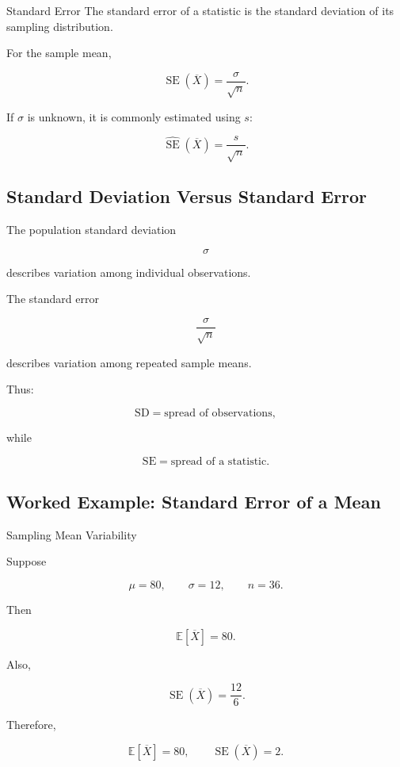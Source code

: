 \begin{definitionbox}{Standard Error}
The standard error of a statistic is the standard deviation of its
sampling distribution.
\end{definitionbox}

For the sample mean,

\[
\boxed{
\operatorname{SE}(\overline{X})
=
\frac{\sigma}{\sqrt{n}}.
}
\]

If \(\sigma\) is unknown, it is commonly estimated using \(s\):

\[
\boxed{
\widehat{\operatorname{SE}}(\overline{X})
=
\frac{s}{\sqrt{n}}.
}
\]

\subsection{Standard Deviation Versus Standard Error}
\label{subsec:sd-versus-se}

The population standard deviation

\[
\sigma
\]

describes variation among individual observations.

The standard error

\[
\frac{\sigma}{\sqrt{n}}
\]

describes variation among repeated sample means.

Thus:

\[
\boxed{
\text{SD}
=
\text{spread of observations},
}
\]

while

\[
\boxed{
\text{SE}
=
\text{spread of a statistic}.
}
\]

\subsection{Worked Example: Standard Error of a Mean}
\label{subsec:worked-se-mean}

\begin{workedexamplebox}{Sampling Mean Variability}

Suppose

\[
\mu=80,
\qquad
\sigma=12,
\qquad
n=36.
\]

Then

\[
\mathbb{E}[\overline{X}]
=
80.
\]

Also,

\[
\operatorname{SE}(\overline{X})
=
\frac{12}{6}.
\]

Therefore,

\begin{answerbox}
\[
\boxed{
\mathbb{E}[\overline{X}]=80,
\qquad
\operatorname{SE}(\overline{X})=2.
}
\]
\end{answerbox}

\end{workedexamplebox}

